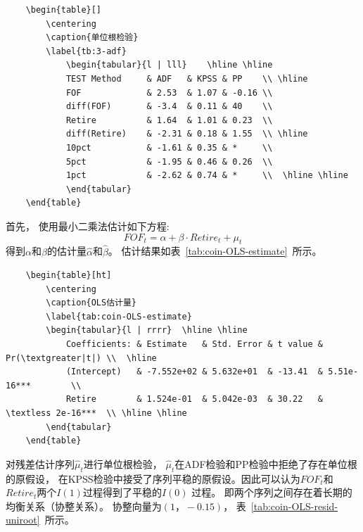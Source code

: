\begin{lstlisting}
    \begin{table}[]
        \centering
        \caption{单位根检验}
        \label{tb:3-adf}
            \begin{tabular}{l | lll}    \hline \hline
            TEST Method     & ADF   & KPSS & PP    \\ \hline
            FOF             & 2.53  & 1.07 & -0.16 \\
            diff(FOF)       & -3.4  & 0.11 & 40    \\
            Retire          & 1.64  & 1.01 & 0.23  \\
            diff(Retire)    & -2.31 & 0.18 & 1.55  \\ \hline
            10pct           & -1.61 & 0.35 & *     \\
            5pct            & -1.95 & 0.46 & 0.26  \\
            1pct            & -2.62 & 0.74 & *     \\  \hline \hline
            \end{tabular}
    \end{table}
\end{lstlisting}

首先， 使用最小二乘法估计如下方程:
$$FOF_t = \alpha + \beta \cdot Retire_t + \mu_t$$
得到$\alpha$和$\beta$的估计量$\hat{\alpha}$和$\hat{\beta}$。 估计结果如表~\ref{tab:coin-OLS-estimate}~所示。

\begin{lstlisting}
    \begin{table}[ht]
        \centering
        \caption{OLS估计量}
        \label{tab:coin-OLS-estimate}
        \begin{tabular}{l | rrrr}  \hline \hline
            Coefficients: & Estimate   & Std. Error & t value & Pr(\textgreater|t|) \\  \hline
            (Intercept)   & -7.552e+02 & 5.632e+01  & -13.41  & 5.51e-16***        \\
            Retire        & 1.524e-01  & 5.042e-03  & 30.22   & \textless 2e-16***  \\ \hline \hline
        \end{tabular}
    \end{table}
\end{lstlisting}


对残差估计序列${\hat{\mu}_t}$进行单位根检验， ${\hat{\mu}_t}$在ADF检验和PP检验中拒绝了存在单位根的原假设， 在KPSS检验中接受了序列平稳的原假设。因此可以认为${FOF_t}$和${Retire_t}$两个$I(1)$过程得到了平稳的$I(0)$
过程。 即两个序列之间存在着长期的均衡关系（协整关系）。 协整向量为$(1， -0.15)$， 表~\ref{tab:coin-OLS-resid-uniroot}~所示。

